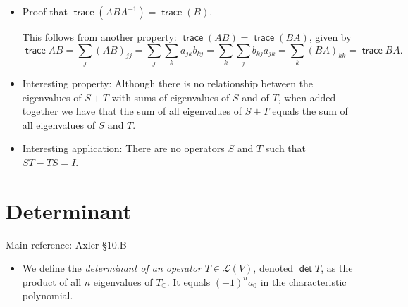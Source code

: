 \documentclass[11pt]{article}
\newcommand{\1}{\mathbf{1}}
\newcommand{\0}{\mathbf{0}}
\newcommand{\B}{\mathcal{B}}
\newcommand{\C}{\mathbb{C}}
\newcommand{\F}{\mathbb{F}}
\newcommand{\cL}{\mathcal{L}}
\newcommand{\R}{\mathbb{R}}
\DeclareMathOperator{\mydim}{\mathsf{dim}}
\DeclareMathOperator{\mytrace}{\mathsf{trace}}
\DeclareMathOperator{\mydet}{\mathsf{det}}
\begin{document}
{\begin{itemize}
And we use the following property of matrix trace:

* If $A$ is invertible, then $\mytrace(A B A^{-1}) = \mytrace(B)$.

The last property implies that $\mytrace [T]_\B$ does not depend on the basis $\B$.
Hence, it is enough to show that the definitions of trace of operator and trace of matrix coincide for \emph{some} basis $\B$.
The first property ensures the existence of a convenient basis, which together with the second property shows that this basis gives the desired equality, proving the theorem.

\item

Proof that $\mytrace(A B A^{-1}) = \mytrace(B)$.

This follows from another property: $\mytrace(AB) = \mytrace(BA)$, given by
\[
\mytrace AB
= \sum_j (AB)_{jj}
= \sum_j \sum_k a_{jk} b_{kj}
= \sum_k \sum_j b_{kj} a_{jk}
= \sum_k (BA)_{kk}
= \mytrace BA.
\]

\item

Interesting property:
Although there is no relationship between the eigenvalues of $S+T$ with sums of eigenvalues of $S$ and of $T$, when added together we have that the sum of all eigenvalues of $S+T$ equals the sum of all eigenvalues of $S$ and $T$.

\item

Interesting application:
There are no operators $S$ and $T$ such that $ST - TS = I$.

\end{itemize}


\clearpage
\section{Determinant}

Main reference:
Axler \S10.B

%

\begin{itemize}

\item

We define the \emph{determinant of an operator} $T \in \cL(V)$, denoted $\mydet T$, as the product of all $n$ eigenvalues of $T_\C$.
It equals $ (-1)^n a_0 $ in the characteristic polynomial.


\end{itemize}}
\end{document}
